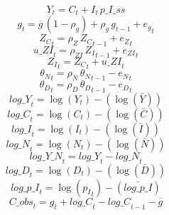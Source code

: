 \begin{dmath}
{{Y}}_{t}={{C}}_{t}+{{I}}_{t}\, {p\_I\_ss}
\end{dmath}
\begin{dmath}
{{g}}_{t}={{\overline{g}}}\, \left(1-{{\rho_g}}\right)+{{\rho_g}}\, {{g}}_{t-1}+{{e_g}}_{t}
\end{dmath}
\begin{dmath}
{{Z_C}}_{t}={{\rho_Z}}\, {{Z_C}}_{t-1}+{{e_Z}}_{t}
\end{dmath}
\begin{dmath}
{u\_ZI}_{t}={{\rho_{ZI}}}\, {{Z_I}}_{t-1}+{{e_{ZI}}}_{t}
\end{dmath}
\begin{dmath}
{{Z_I}}_{t}={{Z_C}}_{t}+{u\_ZI}_{t}
\end{dmath}
\begin{dmath}
{{\theta_N}}_{t}={{\rho_N}}\, {{\theta_N}}_{t-1}-{{e_N}}_{t}
\end{dmath}
\begin{dmath}
{{\theta_D}}_{t}={{\rho_D}}\, {{\theta_D}}_{t-1}-{{e_D}}_{t}
\end{dmath}
\begin{dmath}
{log\_Y}_{t}=\log\left({{Y}}_{t}\right)-(\log\left(\bar{{Y}}\right))
\end{dmath}
\begin{dmath}
{log\_C}_{t}=\log\left({{C}}_{t}\right)-(\log\left(\bar{{C}}\right))
\end{dmath}
\begin{dmath}
{log\_I}_{t}=\log\left({{I}}_{t}\right)-(\log\left(\bar{{I}}\right))
\end{dmath}
\begin{dmath}
{log\_N}_{t}=\log\left({{N}}_{t}\right)-(\log\left(\bar{{N}}\right))
\end{dmath}
\begin{dmath}
{log\_Y\_N}_{t}={log\_Y}_{t}-{log\_N}_{t}
\end{dmath}
\begin{dmath}
{log\_D}_{t}=\log\left({{D}}_{t}\right)-(\log\left(\bar{{D}}\right))
\end{dmath}
\begin{dmath}
{log\_p\_I}_{t}=\log\left({{p_I}}_{t}\right)-(\bar{log\_p\_I})
\end{dmath}
\begin{dmath}
{C\_obs}_{t}={{g}}_{t}+{log\_C}_{t}-{log\_C}_{t-1}-{{\overline{g}}}
\end{dmath}
